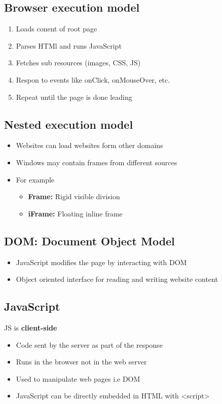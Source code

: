 \documentclass[12pt,a4paper]{article}
\begin{document}
\subsection{Browser execution model}
\begin{enumerate}
    \item Loads conent of root page
    \item Parses HTMl and runs JavaScript
    \item Fetches sub resources (images, CSS, JS)
    \item Respon to events like onClick, onMouseOver, etc.
    \item Repeat until the page is done leading 
\end{enumerate}

\subsection{Nested execution model}
\begin{itemize}
    \item Websites can load websites form other domains
    \item Windows may contain frames from different sources
    \item For example
    \begin{itemize}
        \item \textbf{Frame:} Rigid visible division
        \item \textbf{iFrame:} Floating inline frame 
    \end{itemize}
\end{itemize}

\subsection{DOM: Document Object Model}
\begin{itemize}
    \item JavaScript modifies the page by interacting with DOM
    \item Object oriented interface for reading and writing website content
\end{itemize}

\subsection{JavaScript}
JS is \textbf{client-side}
\begin{itemize}
    \item Code sent by the server as part of the response
    \item Runs in the browser not in the web server
    \item Used to manipulate web pages i.e DOM
    \item JavaScript can be directly embedded in HTML with <script>
\end{itemize}
\end{document}
